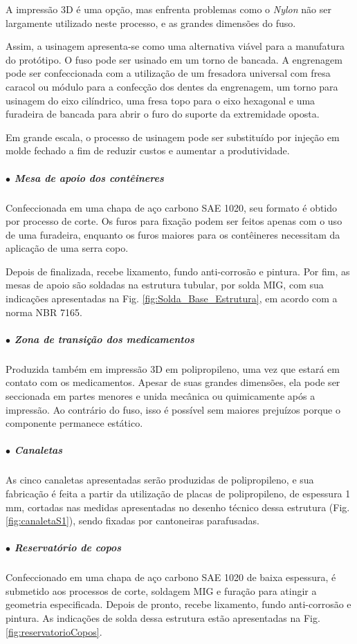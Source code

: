 A impressão 3D é uma opção, mas enfrenta problemas como o \textit{Nylon} não ser largamente utilizado neste processo, e as grandes dimensões do fuso.

Assim, a usinagem apresenta-se como uma alternativa viável para a manufatura do protótipo. O fuso pode ser usinado em um torno de bancada. A engrenagem pode ser confeccionada com a utilização de um fresadora universal com fresa caracol ou módulo para a confecção dos dentes da engrenagem, um torno para usinagem do eixo cilíndrico, uma fresa topo para o eixo hexagonal e uma furadeira de bancada para abrir o furo do suporte da extremidade oposta.

Em grande escala, o processo de usinagem pode ser substituído por injeção em molde fechado a fim de reduzir custos e aumentar a produtividade.

\subparagraph*{$\bullet$ Mesa de apoio dos contêineres} \hfill

Confeccionada em uma chapa de aço carbono SAE 1020, seu formato é obtido por processo de corte. Os furos para fixação podem ser feitos apenas com o uso de uma furadeira, enquanto os furos maiores para os contêineres necessitam da aplicação de uma serra copo.

Depois de finalizada, recebe lixamento, fundo anti-corrosão e pintura. Por fim, as mesas de apoio são soldadas na estrutura tubular, por solda MIG, com sua indicações apresentadas na Fig. \ref{fig:Solda_Base_Estrutura}, em acordo com a norma NBR 7165.

\subparagraph*{$\bullet$ Zona de transição dos medicamentos} \hfill

Produzida também em impressão 3D em polipropileno, uma vez que estará em contato com os medicamentos. Apesar de suas grandes dimensões, ela pode ser seccionada em partes menores e unida mecânica ou quimicamente após a impressão. Ao contrário do fuso, isso é possível sem maiores prejuízos porque o componente permanece estático.

\subparagraph*{$\bullet$ Canaletas} \hfill

As cinco canaletas apresentadas serão produzidas de polipropileno, e sua fabricação é feita a partir da utilização de placas de polipropileno, de espessura 1 mm, cortadas nas medidas apresentadas no desenho técnico dessa estrutura (Fig. \ref{fig:canaletaS1}), sendo fixadas por cantoneiras parafusadas.

\subparagraph*{$\bullet$ Reservatório de copos} \hfill

Confeccionado em uma chapa de aço carbono SAE 1020 de baixa espessura, é submetido aos processos de corte, soldagem MIG e furação para atingir a geometria especificada. Depois de pronto, recebe lixamento, fundo anti-corrosão e pintura. As indicações de solda dessa estrutura estão apresentadas na Fig. \ref{fig:reservatorioCopos}.

